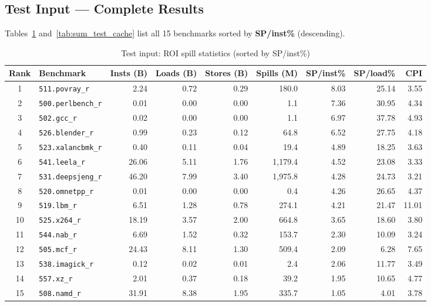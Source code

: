 \documentclass[11pt,a4paper]{article}
\begin{document}
\clearpage
\subsection{Test Input --- Complete Results}
\label{subsec:summary_test}

Tables~\ref{tab:sum_test_spill} and~\ref{tab:sum_test_cache} list all
15 benchmarks sorted by \textbf{SP/inst\%} (descending).

\begin{landscape}
\begin{table}[p]
\centering
\caption{Test input: ROI spill statistics (sorted by SP/inst\%)}
\label{tab:sum_test_spill}
\small
\begin{tabular}{clrrrrrrr}
\toprule
\textbf{Rank} & \textbf{Benchmark} & \textbf{Insts (B)} & \textbf{Loads (B)} &
\textbf{Stores (B)} & \textbf{Spills (M)} & \textbf{SP/inst\%} &
\textbf{SP/load\%} & \textbf{CPI} \\
\midrule
1 & \texttt{511.povray\_r} & 2.24 & 0.72 & 0.29 & 180.0 & 8.03 & 25.14 & 3.55 \\
2 & \texttt{500.perlbench\_r} & 0.01 & 0.00 & 0.00 & 1.1 & 7.36 & 30.95 & 4.34 \\
3 & \texttt{502.gcc\_r} & 0.02 & 0.00 & 0.00 & 1.1 & 6.97 & 37.78 & 4.93 \\
4 & \texttt{526.blender\_r} & 0.99 & 0.23 & 0.12 & 64.8 & 6.52 & 27.75 & 4.18 \\
5 & \texttt{523.xalancbmk\_r} & 0.40 & 0.11 & 0.04 & 19.4 & 4.89 & 18.25 & 3.63 \\
6 & \texttt{541.leela\_r} & 26.06 & 5.11 & 1.76 & 1,179.4 & 4.52 & 23.08 & 3.33 \\
7 & \texttt{531.deepsjeng\_r} & 46.20 & 7.99 & 3.40 & 1,975.8 & 4.28 & 24.73 & 3.21 \\
8 & \texttt{520.omnetpp\_r} & 0.01 & 0.00 & 0.00 & 0.4 & 4.26 & 26.65 & 4.37 \\
9 & \texttt{519.lbm\_r} & 6.51 & 1.28 & 0.78 & 274.1 & 4.21 & 21.47 & 11.01 \\
10 & \texttt{525.x264\_r} & 18.19 & 3.57 & 2.00 & 664.8 & 3.65 & 18.60 & 3.80 \\
11 & \texttt{544.nab\_r} & 6.69 & 1.52 & 0.32 & 153.7 & 2.30 & 10.09 & 3.24 \\
12 & \texttt{505.mcf\_r} & 24.43 & 8.11 & 1.30 & 509.4 & 2.09 & 6.28 & 7.65 \\
13 & \texttt{538.imagick\_r} & 0.12 & 0.02 & 0.01 & 2.4 & 2.06 & 11.77 & 3.49 \\
14 & \texttt{557.xz\_r} & 2.01 & 0.37 & 0.18 & 39.2 & 1.95 & 10.65 & 4.77 \\
15 & \texttt{508.namd\_r} & 31.91 & 8.38 & 1.95 & 335.7 & 1.05 & 4.01 & 3.78 \\
\bottomrule
\end{tabular}
\end{table}


\end{landscape}
\end{document}
